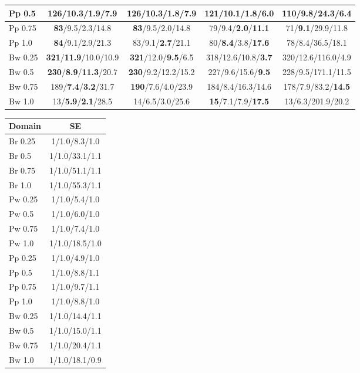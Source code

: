 \documentclass{article}
\begin{document}
\begin{table*}[t]
\begin{minipage}{4.96in}
\begin{tabular}{|@{}l@{}|@{}c@{ }c@{ }c@{ }c@{}|}
Pp	0.5	&{\bf 126}/10.3/1.9/7.9 	&{\bf 126}/10.3/{\bf 1.8}/7.9 	&121/10.1/1.8/{\bf 6.0} 	&110/{\bf 9.8}/24.3/6.4 	\\ \hline
Pp	0.75	&{\bf 83}/9.5/2.3/14.8 	&{\bf 83}/9.5/2.0/14.8 	&79/9.4/{\bf 2.0}/{\bf 11.1} 	&71/{\bf 9.1}/29.9/11.8 	\\ \hline
Pp	1.0	&{\bf 84}/9.1/2.9/21.3 	&83/9.1/{\bf 2.7}/21.1 	&80/{\bf 8.4}/3.8/{\bf 17.6} 	&78/8.4/36.5/18.1 	\\ \hline
\hline
Bw	0.25	&{\bf 321}/{\bf 11.9}/10.0/10.9 	&{\bf 321}/12.0/{\bf 9.5}/6.5 	&318/12.6/10.8/{\bf 3.7} 	&320/12.6/116.0/4.9 	\\ \hline
Bw	0.5	&{\bf 230}/{\bf 8.9}/{\bf 11.3}/20.7 	&{\bf 230}/9.2/12.2/15.2 	&227/9.6/15.6/{\bf 9.5} 	&228/9.5/171.1/11.5 	\\ \hline
Bw	0.75	&189/{\bf 7.4}/{\bf 3.2}/31.7 	&{\bf 190}/7.6/4.0/23.9 	&184/8.4/16.3/14.6 	&178/7.9/83.2/{\bf 14.5} 	\\ \hline
Bw	1.0	&13/{\bf 5.9}/{\bf 2.1}/28.5 	&14/6.5/3.0/25.6 	&{\bf 15}/7.1/7.9/{\bf 17.5} 	&13/6.3/201.9/20.2 	\\ \hline
\end{tabular}\caption{\label{tab:questionComp1} Goal-directed KA
Average Performance using . Bold indicates best performance. (Num
Solved/Num Steps/Time (s)/Questions)}
\end{minipage}
\begin{minipage}{1.75in}\centering
\small\begin{tabular}{|@{}l@{}|@{}c@{}|}\hline
Domain & SE  \\ \hline
Br	0.25	&1/1.0/8.3/1.0 	\\ \hline
Br	0.5	&1/1.0/33.1/1.1 	\\ \hline
Br	0.75	&1/1.0/51.1/1.1 	\\ \hline
Br	1.0	&1/1.0/55.3/1.1 	\\ \hline
\hline
Pw	0.25	&1/1.0/5.4/1.0 	\\ \hline
Pw	0.5	&1/1.0/6.0/1.0 	\\ \hline
Pw	0.75	&1/1.0/7.4/1.0 	\\ \hline
Pw	1.0	&1/1.0/18.5/1.0 	\\ \hline
\hline
Pp	0.25	&1/1.0/4.9/1.0 	\\ \hline
Pp	0.5	&1/1.0/8.8/1.1 	\\ \hline
Pp	0.75	&1/1.0/9.7/1.1 	\\ \hline
Pp	1.0	&1/1.0/8.8/1.0 	\\ \hline
\hline
Bw	0.25	&1/1.0/14.4/1.1 	\\ \hline
Bw	0.5	&1/1.0/15.0/1.1 	\\ \hline
Bw	0.75	&1/1.0/20.4/1.1 	\\ \hline
Bw	1.0	&1/1.0/18.1/0.9 	\\ \hline
\end{tabular}\caption{\label{tab:rpComp} Plan versus
Relaxed Plan Ratio in SE.}
\end{minipage}
\end{table*}
\end{document}
